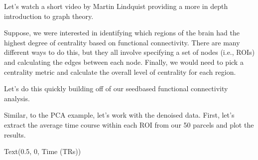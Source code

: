\documentclass[letterpaper,10pt,english]{sphinxmanual}
\begin{document}

Let’s watch a short video by Martin Lindquist providing a more in depth introduction to graph theory.

\begin{sphinxVerbatim}[commandchars=\\\{\}]
\end{sphinxVerbatim}

\noindent{}

Suppose, we were interested in identifying which regions of the brain had the highest degree of centrality based on functional connectivity. There are many different ways to do this, but they all involve specifying a set of nodes (i.e., ROIs) and calculating the edges between each node. Finally, we would need to pick a centrality metric and calculate the overall level of centrality for each region.

Let’s do this quickly building off of our seed\sphinxhyphen{}based functional connectivity analysis.

Similar, to the PCA example, let’s work with the denoised data. First, let’s extract the average time course within each ROI from our 50 parcels and plot the results.

\begin{sphinxVerbatim}[commandchars=\\\{\}]
  

 
 
\end{sphinxVerbatim}

\begin{sphinxVerbatim}[commandchars=\\\{\}]
Text(0.5, 0, \PYGZsq{}Time (TRs)\PYGZsq{})
\end{sphinxVerbatim}
\end{document}
